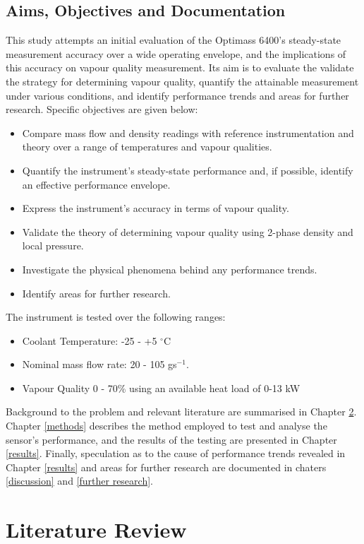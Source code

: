 \documentclass{report}
\begin{document}
\section{Aims, Objectives and Documentation}
This study attempts an initial evaluation of the Optimass 6400's steady-state measurement accuracy over a wide operating envelope, and the implications of this accuracy on vapour quality measurement. Its aim is to evaluate the validate the strategy for determining vapour quality, quantify the attainable measurement under various conditions, and identify performance trends and areas for further research. Specific objectives are given below:
\begin{itemize}
\item{Compare mass flow and density readings with reference instrumentation and theory over a range of temperatures and vapour qualities.}
\item{Quantify the instrument's steady-state performance and, if possible, identify an effective performance envelope.}
\item{Express the instrument's accuracy in terms of vapour quality.}
\item{Validate the theory of determining vapour quality using 2-phase density and local pressure.}
\item{Investigate the physical phenomena behind any performance trends.}
\item{Identify areas for further research.}
\end{itemize}
The instrument is tested over the following ranges:
\begin{itemize}
\item{Coolant Temperature: -25 - +5 $^\circ$C}
\item{Nominal mass flow rate: 20 - 105 gs$^{-1}$.}
\item{Vapour Quality 0 - 70\% using an available heat load of 0-13 kW}
\end{itemize}
Background to the problem and relevant literature are summarised in Chapter \ref{litReview}. Chapter \ref{methods} describes the method employed to test and analyse the sensor's performance, and the results of the testing are presented in Chapter \ref{results}. Finally, speculation as to the cause of performance trends revealed in Chapter \ref{results} and areas for further research are documented in chaters \ref{discussion} and \ref{further research}.


\chapter{Literature Review} \label{litReview}
\FloatBarrier
\end{document}
